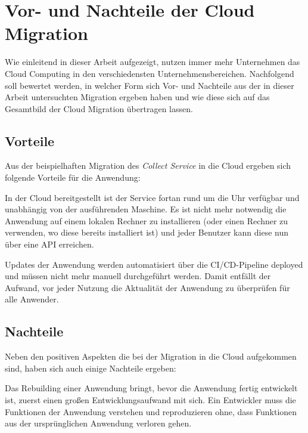\section{Vor- und Nachteile der Cloud Migration}
Wie einleitend in dieser Arbeit aufgezeigt, nutzen immer mehr Unternehmen das Cloud Computing in den verschiedensten Unternehmensbereichen. Nachfolgend soll bewertet werden, in welcher Form sich Vor- und Nachteile aus der in dieser Arbeit untersuchten Migration ergeben haben und wie diese sich auf das Gesamtbild der Cloud Migration übertragen lassen.

\subsection{Vorteile}
Aus der beispielhaften Migration des \textit{Collect Service} in die Cloud ergeben sich folgende Vorteile für die Anwendung:

In der Cloud bereitgestellt ist der Service fortan rund um die Uhr verfügbar und unabhängig von der ausführenden Maschine. Es ist nicht mehr notwendig die Anwendung auf einem lokalen Rechner zu installieren (oder einen Rechner zu verwenden, wo diese bereits installiert ist) und jeder Benutzer kann diese nun über eine \ac{API} erreichen.

Updates der Anwendung werden automatisiert über die \ac{CI/CD}-Pipeline deployed und müssen nicht mehr manuell durchgeführt werden. Damit entfällt der Aufwand, vor jeder Nutzung die Aktualität der Anwendung zu überprüfen für alle Anwender.
\pagebreak

\subsection{Nachteile}
Neben den positiven Aspekten die bei der Migration in die Cloud aufgekommen sind, haben sich auch einige Nachteile ergeben:

Das Rebuilding einer Anwendung bringt, bevor die Anwendung fertig entwickelt ist, zuerst einen großen Entwicklungsaufwand mit sich. Ein Entwickler muss die Funktionen der Anwendung verstehen und reproduzieren ohne, dass Funktionen aus der ursprünglichen Anwendung verloren gehen.
\pagebreak